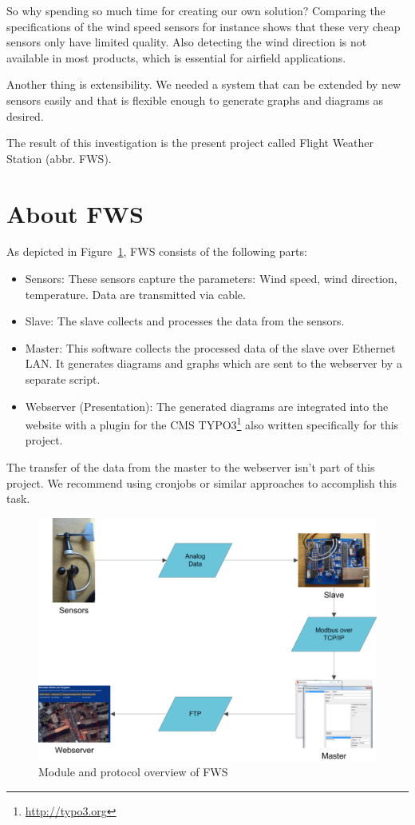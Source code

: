 So why spending so much time for creating our own solution? Comparing the specifications of the wind speed sensors for instance shows that these very cheap sensors only have limited quality. Also detecting the wind direction is not available in most products, which is essential for airfield applications.

Another thing is extensibility. We needed a system that can be extended by new sensors easily and that is flexible enough to generate graphs and diagrams as desired.

The result of this investigation is the present project called Flight Weather Station (abbr. FWS).

\section{About FWS} %
\label{sec:about_fws}

As depicted in Figure~\ref{fig:fws_overview}, FWS consists of the following parts:
\begin{itemize}
\item Sensors: These sensors capture the parameters: Wind speed, wind direction, temperature. Data are transmitted via cable.
\item Slave: The slave collects and processes the data from the sensors.
\item Master: This software collects the processed data of the slave over Ethernet LAN. It generates diagrams and graphs which are sent to the webserver by a separate script.
\item Webserver (Presentation): The generated diagrams are integrated into the website with a plugin for the CMS TYPO3\footnote{\url{http://typo3.org}} also written specifically for this project.
\end{itemize}

The transfer of the data from the master to the webserver isn't part of this project. We recommend using cronjobs or similar approaches to accomplish this task.

\begin{figure}[ht]
    \centering
    \includegraphics[width=\linewidth]{graphics/overview.png}
    \caption{Module and protocol overview of FWS}
    \label{fig:fws_overview}
\end{figure}

